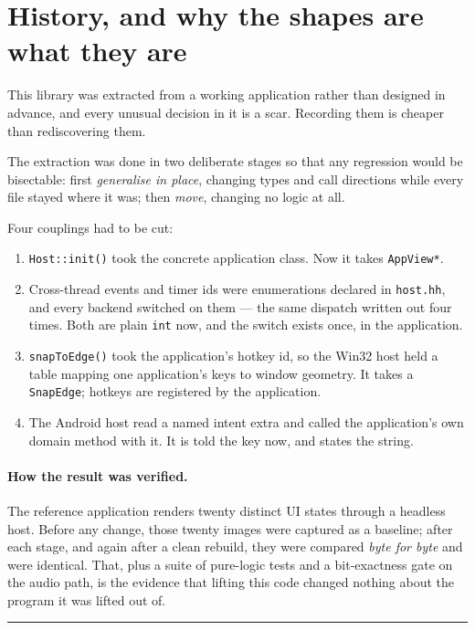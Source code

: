\documentclass[11pt,a4paper]{article}
\begin{document}
\section{History, and why the shapes are what they are}

This library was extracted from a working application rather than designed in
advance, and every unusual decision in it is a scar. Recording them is cheaper
than rediscovering them.

The extraction was done in two deliberate stages so that any regression would be
bisectable: first \emph{generalise in place}, changing types and call directions
while every file stayed where it was; then \emph{move}, changing no logic at all.

Four couplings had to be cut:

\begin{enumerate}[leftmargin=*]
\item \texttt{Host::init()} took the concrete application class. Now it takes
  \texttt{AppView*}.
\item Cross-thread events and timer ids were enumerations declared in
  \texttt{host.hh}, and every backend switched on them --- the same dispatch
  written out four times. Both are plain \texttt{int} now, and the switch exists
  once, in the application.
\item \texttt{snapToEdge()} took the application's hotkey id, so the Win32 host
  held a table mapping one application's keys to window geometry. It takes a
  \texttt{SnapEdge}; hotkeys are registered by the application.
\item The Android host read a named intent extra and called the application's
  own domain method with it. It is told the key now, and states the string.
\end{enumerate}

\paragraph{How the result was verified.} The reference application renders
twenty distinct UI states through a headless host. Before any change, those
twenty images were captured as a baseline; after each stage, and again after a
clean rebuild, they were compared \emph{byte for byte} and were identical. That,
plus a suite of pure-logic tests and a bit-exactness gate on the audio path, is
the evidence that lifting this code changed nothing about the program it was
lifted out of.

\vfill
\begin{center}
\rule{0.4\textwidth}{0.4pt}
\end{center}
\end{document}
